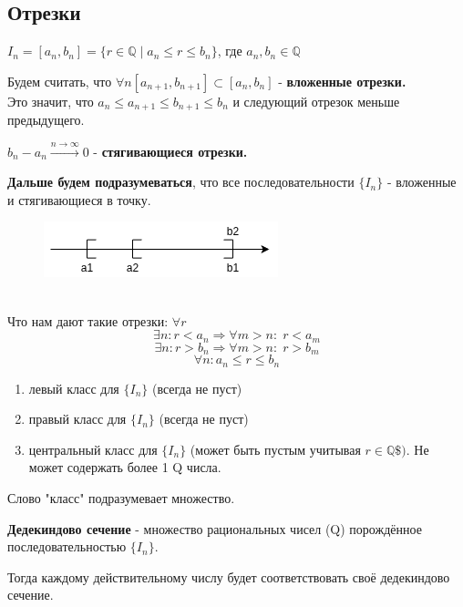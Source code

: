 \documentclass[12pt, paper]{article}
\newcommand{\Q}{\mathbb{Q}}
\begin{document}
\subsection*{Отрезки}
$I_n = [a_n, b_n] = \{ r \in \Q\; |\; a_n \leq r \leq b_n \}$, где $a_n, b_n \in \Q$
\begin{tcolorbox}
Будем считать, что $\forall n [a_{n+1}, b_{n+1}] \subset [a_n, b_n]$ - \textbf{вложенные отрезки.}\\
Это значит, что $a_n \leq a_{n+1} \leq b_{n+1} \leq b_n$ и следующий отрезок меньше предыдущего.
\end{tcolorbox}
\begin{tcolorbox}
    $b_n - a_n \xrightarrow{n\to\infty} 0$ - \textbf{стягивающиеся отрезки.}
\end{tcolorbox}
\textbf{Дальше будем подразумеваться}, что все последовательности $\{I_n\}$ - вложенные и стягивающиеся в точку.
\begin{figure}[h]
    \includegraphics[width=0.25\linewidth]{images/Дедекиндовы сечения/Смысл отрезков.png}
\end{figure}\\
Что нам дают такие отрезки: $\forall r$ \\
\begin{equation}
    \exists n: r < a_n \Rightarrow \forall m > n:\; r < a_m
\end{equation}
\begin{equation}
    \exists n: r > b_n \Rightarrow \forall m > n:\; r > b_m
\end{equation}
\begin{equation}
    \forall n: a_n \leq r \leq b_n
\end{equation}
\begin{enumerate}
    \item левый класс для $\{I_n\}$ (всегда не пуст)
    \item правый класс для $\{I_n\}$ (всегда не пуст)
    \item центральный класс для $\{I_n\}$ (может быть пустым учитывая $r \in \Q\$)$. Не может содержать более 1 Q числа.
\end{enumerate}
Слово "класс" подразумевает множество.
\begin{tcolorbox}
    \textbf{Дедекиндово сечение}  - множество рациональных чисел (Q) порождённое последовательностью $\{I_n\}$.
\end{tcolorbox}
Тогда каждому действительному числу будет соответствовать своё дедекиндово сечение.
\end{document}
